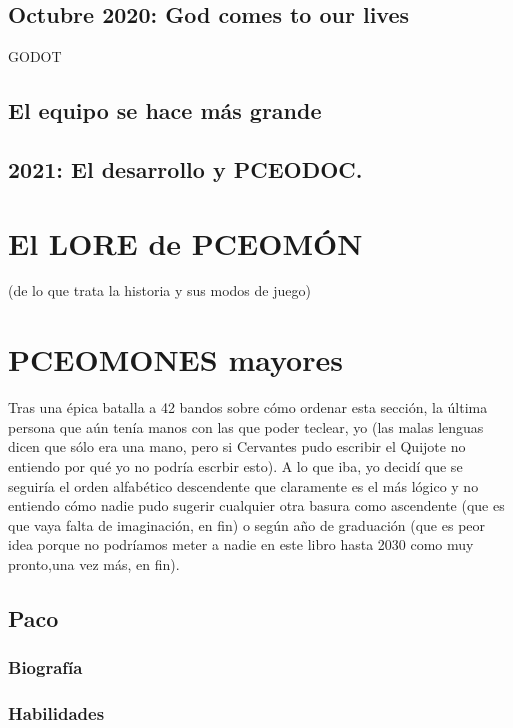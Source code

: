 \documentclass[letterpaper]{article}
\begin{document}
\subsection{Octubre 2020: God comes to our lives}

GODOT

\subsection{El equipo se hace más grande}

\subsection{2021: El desarrollo y PCEODOC.}

\section{El LORE de PCEOMÓN}
(de lo que trata la historia y sus modos de juego)

\section{PCEOMONES mayores}
Tras una épica batalla a 42 bandos sobre cómo ordenar esta sección, la última persona que aún tenía manos con las que poder teclear, yo (las malas lenguas dicen que
sólo era una mano, pero si Cervantes pudo escribir el Quijote no entiendo por qué yo no podría escrbir esto). A lo que iba, yo decidí que se seguiría el orden 
alfabético descendente que claramente es el más lógico y no entiendo cómo nadie pudo sugerir cualquier otra basura como ascendente (que es que vaya falta de 
imaginación, en fin) o según año de graduación (que es peor idea porque no podríamos meter a nadie en este libro hasta 2030 como muy pronto,una vez más, en fin).
\subsection{Paco}

\subsubsection{Biografía}

\subsubsection{Habilidades}
\end{document}
